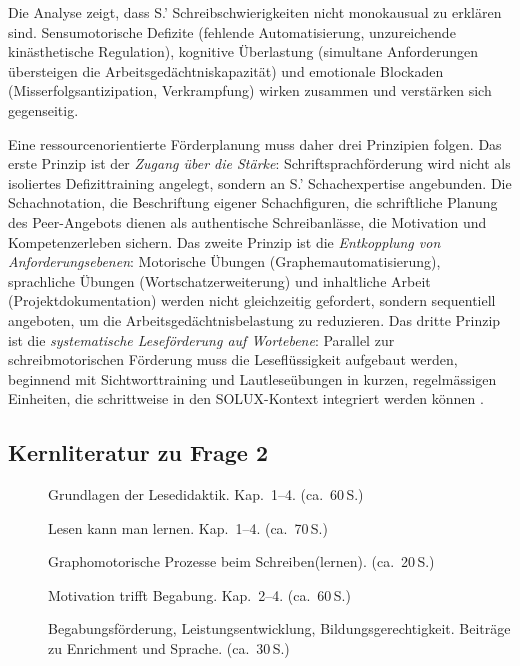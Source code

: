 \documentclass[ngerman, a4paper]{article}
\begin{document}
Die Analyse zeigt, dass S.' Schreibschwierigkeiten nicht monokausual zu erklären sind.
Sensumotorische Defizite (fehlende Automatisierung, unzureichende kinästhetische
Regulation), kognitive Überlastung (simultane Anforderungen übersteigen die
Arbeitsgedächtniskapazität) und emotionale Blockaden (Misserfolgsantizipation,
Verkrampfung) wirken zusammen und verstärken sich gegenseitig.

Eine ressourcenorientierte Förderplanung muss daher drei Prinzipien folgen. Das erste
Prinzip ist der \textit{Zugang über die Stärke}: Schriftsprachförderung wird nicht als
isoliertes Defizittraining angelegt, sondern an S.' Schachexpertise angebunden. Die
Schachnotation, die Beschriftung eigener Schachfiguren, die schriftliche Planung des
Peer-Angebots dienen als authentische Schreibanlässe, die Motivation und Kompetenzerleben
sichern. Das zweite Prinzip ist die \textit{Entkopplung von Anforderungsebenen}: Motorische
Übungen (Graphemautomatisierung), sprachliche Übungen (Wortschatzerweiterung) und
inhaltliche Arbeit (Projektdokumentation) werden nicht gleichzeitig gefordert, sondern
sequentiell angeboten, um die Arbeitsgedächtnisbelastung zu reduzieren. Das dritte
Prinzip ist die \textit{systematische Leseförderung auf Wortebene}: Parallel zur
schreibmotorischen Förderung muss die Leseflüssigkeit aufgebaut werden, beginnend
mit Sichtworttraining und Lautleseübungen in kurzen, regelmässigen Einheiten, die
schrittweise in den SOLUX-Kontext integriert werden können
\parencite{rosebrock2010grundlagen,gold2018lesenkannmanlernen}.

\subsection{Kernliteratur zu Frage 2}
 
\begin{description}
  \item[\cite{rosebrock2010grundlagen}] Grundlagen der Lesedidaktik. Kap.~1--4. (ca.~60\,S.)
  \item[\cite{gold2018lesenkannmanlernen}] Lesen kann man lernen. Kap.~1--4. (ca.~70\,S.)
  \item[\cite{sturm2016graphomotorik}] Graphomotorische Prozesse beim Schreiben(lernen). (ca.~20\,S.)
  \item[\cite{lehwald2017motivation}] Motivation trifft Begabung. Kap.~2--4. (ca.~60\,S.)
  \item[\cite{fischer2020begabungsfoerderung}] Begabungsförderung, Leistungsentwicklung, Bildungsgerechtigkeit.
    Beiträge zu Enrichment und Sprache. (ca.~30\,S.)
\end{description}
 
\end{document}
